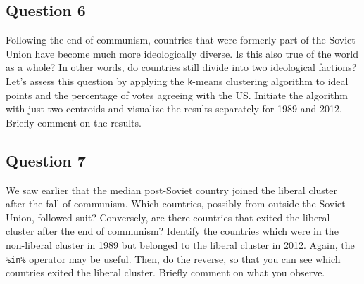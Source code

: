 \documentclass[]{article}
\begin{document}
\subsection{Question 6}\label{question-6}

Following the end of communism, countries that were formerly part of the
Soviet Union have become much more ideologically diverse. Is this also
true of the world as a whole? In other words, do countries still divide
into two ideological factions? Let's assess this question by applying
the \texttt{k}-means clustering algorithm to ideal points and the
percentage of votes agreeing with the US. Initiate the algorithm with
just two centroids and visualize the results separately for 1989 and
2012. Briefly comment on the results.

\subsection{Question 7}\label{question-7}

We saw earlier that the median post-Soviet country joined the liberal
cluster after the fall of communism. Which countries, possibly from
outside the Soviet Union, followed suit? Conversely, are there countries
that exited the liberal cluster after the end of communism? Identify the
countries which were in the non-liberal cluster in 1989 but belonged to
the liberal cluster in 2012. Again, the \texttt{\%in\%} operator may be
useful. Then, do the reverse, so that you can see which countries exited
the liberal cluster. Briefly comment on what you observe.
\end{document}

